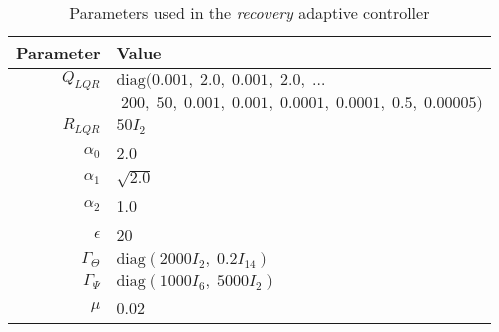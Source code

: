 
\begin{table}[htb]
 \renewcommand{\arraystretch}{1.6}
  \begin{tabular}{r|l}
    \textbf{Parameter} & \textbf{Value} \\
    \hline
	$Q_{LQR}$ & $\text{diag}(0.001, \; 2.0, \; 0.001, \; 2.0, \; \ldots $\\ & \qquad $\; 200, \; 50, \; 0.001, \; 0.001, \; 0.0001, \; 0.0001, \; 0.5, \; 0.00005)$ \\ 
	$R_{LQR}$ & $50 I_2$ \\
	$\alpha_0$ & 2.0 \\
	$\alpha_1$ & $\sqrt{2.0}$ \\
	$\alpha_2$ & 1.0 \\
	$\epsilon$ & 20 \\
	$\Gamma_\Theta$ & $\text{diag}(2000 I_2, \;0.2 I_{14})$ \\
	$\Gamma_\Psi$ & $\text{diag}(1000 I_6, \; 5000 I_2)$ \\
	$\mu$ & 0.02
  \end{tabular}
  \caption{Parameters used in the \textit{recovery} adaptive controller}
\end{table}

\clearpage
\newpage
